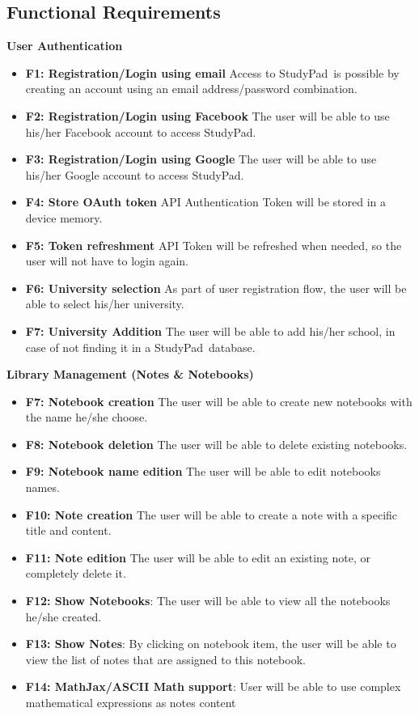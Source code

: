 \documentclass[thesis=B,english]{FITthesis}[2012/10/20]
\newcommand{\appname}{StudyPad}
\begin{document}
\subsection{Functional Requirements}
\bigskip
\textbf{User Authentication}
\begin{itemize}
	\item \textbf{F1: Registration/Login using email} Access to \appname\ is possible by creating an account using an email address/password combination.
	\item \textbf{F2: Registration/Login using Facebook} The user will be able to use his/her Facebook account to access \appname.
	\item \textbf{F3: Registration/Login using Google} The user will be able to use his/her Google account to access \appname.
	\item \textbf{F4: Store OAuth token} API Authentication Token will be stored in a device memory.
	\item \textbf{F5: Token refreshment} API Token will be refreshed when needed, so the user will not have to login again.
	\item \textbf{F6: University selection} As part of user registration flow, the user will be able to select his/her university.
	\item \textbf{F7: University Addition} The user will be able to add his/her school, in case of not finding it in a \appname\ database.
\end{itemize}
\bigskip
\textbf{Library Management (Notes \& Notebooks)}
\begin{itemize}
	\item \textbf{F7: Notebook creation} The user will be able to create new notebooks with the name he/she choose.
	\item \textbf{F8: Notebook deletion} The user will be able to delete existing notebooks.
	\item \textbf{F9: Notebook name edition} The user will be able to edit notebooks names.
	\item \textbf{F10: Note creation} The user will be able to create a note with a specific title and content.
	\item \textbf{F11: Note edition} The user will be able to edit an existing note, or completely delete it.
	\item \textbf{F12: Show Notebooks}: The user will be able to view all the notebooks he/she created.
	\item \textbf{F13: Show Notes}: By clicking on notebook item, the user will be able to view the list of notes that are assigned to this notebook.
	\item \textbf{F14: MathJax/ASCII Math support}: User will be able to use complex mathematical expressions as notes content
\end{itemize}
\end{document}
